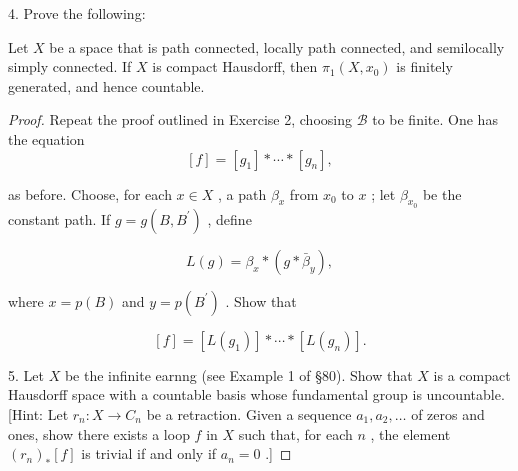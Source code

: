 4. Prove the following:

\begin{theorem} Let \(X\) be a space that is path connected, locally path connected, and semilocally simply connected. If \(X\) is compact Hausdorff, then \({\pi }_{1}\left( {X,{x}_{0}}\right)\) is finitely generated, and hence countable.
\end{theorem}

\begin{proof}Repeat the proof outlined in Exercise 2, choosing \(\mathcal{B}\) to be finite. One has the equation
\[
\left\lbrack  f\right\rbrack = \left\lbrack  {g}_{1}\right\rbrack * \cdots  * \left\lbrack  {g}_{n}\right\rbrack  ,
\]

as before. Choose, for each \(x \in  X\) , a path \({\beta }_{x}\) from \({x}_{0}\) to \(x\) ; let \({\beta }_{{x}_{0}}\) be the constant path. If \(g = g\left( {B,{B}^{\prime }}\right)\) , define

\[
L\left( g\right)  = {\beta }_{x} * \left( {g * {\bar{\beta }}_{y}}\right) ,
\]

where \(x = p\left( B\right)\) and \(y = p\left( {B}^{\prime }\right)\) . Show that

\[
\left\lbrack  f\right\rbrack = \left\lbrack  {L\left( {g}_{1}\right) }\right\rbrack * \cdots  * \left\lbrack  {L\left( {g}_{n}\right) }\right\rbrack  .
\]

5. Let \(X\) be the infinite earnng (see Example 1 of  \S 80). Show that \(X\) is a compact Hausdorff space with a countable basis whose fundamental group is uncountable. [Hint: Let \({r}_{n} : X \rightarrow  {C}_{n}\) be a retraction. Given a sequence \({a}_{1},{a}_{2},\ldots\) of zeros and ones, show there exists a loop \(f\) in \(X\) such that, for each \(n\) , the element \({\left( {r}_{n}\right) }_{ * }\left\lbrack  f\right\rbrack\) is trivial if and only if \({a}_{n} = 0\) .]\end{proof}